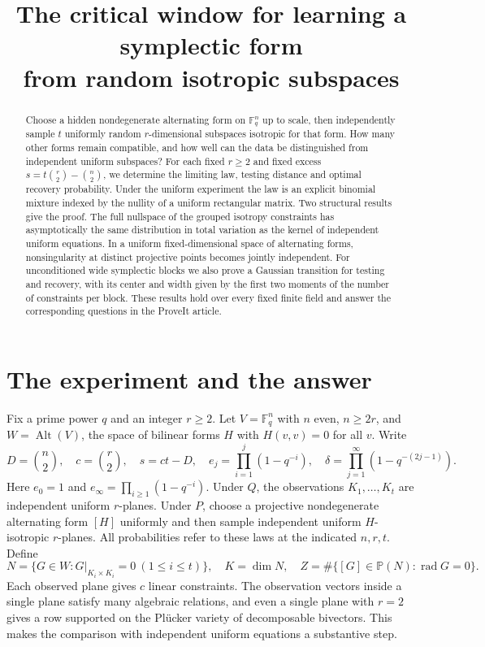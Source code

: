 \documentclass[11pt]{article}
\title{The critical window for learning a symplectic form\\from random isotropic subspaces}
\author{}
\date{}
\newcommand{\F}{\mathbb F}
\newcommand{\Alt}{\operatorname{Alt}}
\newcommand{\radic}{\operatorname{rad}}
\begin{document}
\maketitle
\begin{abstract}
Choose a hidden nondegenerate alternating form on $\F_q^n$ up to scale, then independently sample $t$ uniformly random $r$-dimensional subspaces isotropic for that form. How many other forms remain compatible, and how well can the data be distinguished from independent uniform subspaces? For each fixed $r\ge2$ and fixed excess $s=t\binom r2-\binom n2$, we determine the limiting law, testing distance and optimal recovery probability. Under the uniform experiment the law is an explicit binomial mixture indexed by the nullity of a uniform rectangular matrix. Two structural results give the proof. The full nullspace of the grouped isotropy constraints has asymptotically the same distribution in total variation as the kernel of independent uniform equations. In a uniform fixed-dimensional space of alternating forms, nonsingularity at distinct projective points becomes jointly independent. For unconditioned wide symplectic blocks we also prove a Gaussian transition for testing and recovery, with its center and width given by the first two moments of the number of constraints per block. These results hold over every fixed finite field and answer the corresponding questions in the ProveIt article.
\end{abstract}

\section{The experiment and the answer}
Fix a prime power $q$ and an integer $r\ge2$. Let $V=\F_q^n$ with $n$ even, $n\ge2r$, and $W=\Alt(V)$, the space of bilinear forms $H$ with $H(v,v)=0$ for all $v$. Write
\[
 D=\binom n2,\quad c=\binom r2,\quad s=ct-D,\quad
 e_j=\prod_{i=1}^j(1-q^{-i}),\quad
 \delta=\prod_{j=1}^\infty(1-q^{-(2j-1)}).
\]
Here $e_0=1$ and $e_\infty=\prod_{i\ge1}(1-q^{-i})$. Under $Q$, the observations $K_1,\ldots,K_t$ are independent uniform $r$-planes. Under $P$, choose a projective nondegenerate alternating form $[H]$ uniformly and then sample independent uniform $H$-isotropic $r$-planes. All probabilities refer to these laws at the indicated $n,r,t$. Define
\[
 N=\{G\in W:G|_{K_i\times K_i}=0\ (1\le i\le t)\},\quad K=\dim N,
 \quad Z=\#\{[G]\in \mathbb P(N):\radic G=0\}.
\]
Each observed plane gives $c$ linear constraints. The observation vectors inside a single plane satisfy many algebraic relations, and even a single plane with $r=2$ gives a row supported on the Pl\"ucker variety of decomposable bivectors. This makes the comparison with independent uniform equations a substantive step.
\end{document}
